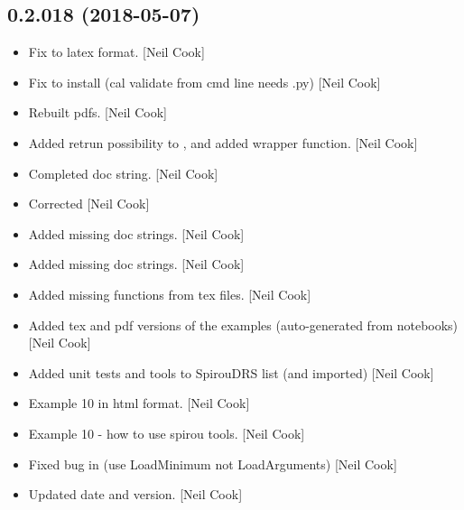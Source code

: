 \documentclass[a4paper,10pt,english]{report}
\begin{document}
\subsection{0.2.018 (2018-05-07)}
\label{\detokenize{misc/changelog:id443}}\begin{itemize}
\item {} 
Fix to latex format. {[}Neil Cook{]}

\item {} 
Fix to install (cal validate from cmd line needs .py) {[}Neil Cook{]}

\item {} 
Rebuilt pdfs. {[}Neil Cook{]}

\item {} 
Added retrun possibility to , and added
 wrapper function. {[}Neil Cook{]}

\item {} 
Completed doc string. {[}Neil Cook{]}

\item {} 
Corrected  {[}Neil Cook{]}

\item {} 
Added missing doc strings. {[}Neil Cook{]}

\item {} 
Added missing doc strings. {[}Neil Cook{]}

\item {} 
Added missing functions from tex files. {[}Neil Cook{]}

\item {} 
Added tex and pdf versions of the examples (auto-generated from
notebooks) {[}Neil Cook{]}

\item {} 
Added unit tests and tools to SpirouDRS  list (and imported)
{[}Neil Cook{]}

\item {} 
Example 10 in html format. {[}Neil Cook{]}

\item {} 
Example 10 - how to use spirou tools. {[}Neil Cook{]}

\item {} 
Fixed bug in  (use LoadMinimum not LoadArguments) {[}Neil
Cook{]}

\item {} 
Updated date and version. {[}Neil Cook{]}


\end{itemize}
\end{document}

